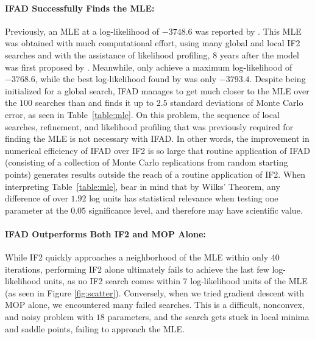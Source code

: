 \documentclass[9pt,twocolumn,pnasresearcharticle]{pnas-new}
\begin{document}
\paragraph{IFAD Successfully Finds the MLE:} Previously, an MLE at a log-likelihood of $-3748.6$ was reported by \cite{king16}.
This MLE was obtained with much computational effort, using many global and local IF2 searches and with the assistance of likelihood profiling, 8 years after the model was first proposed by \cite{king08}.
Meanwhile, \cite{ionides15} only achieve a maximum log-likelihood of $-3768.6$, while the best log-likelihood found by \cite{king08} was only $-3793.4$.
Despite being initialized for a global search, IFAD manages to get much closer to the MLE over the $100$ searches than \cite{ionides15} and finds it up to $2.5$ standard deviations of Monte Carlo error, as seen in Table~\ref{table:mle}.
On this problem, the sequence of local searches, refinement, and likelihood profiling that was previously required for finding the MLE is not necessary with IFAD. 
In other words, the improvement in numerical efficiency of IFAD over IF2 is so large that routine application of IFAD (consisting of a collection of Monte Carlo replications from random starting points) generates results outside the reach of a routine application of IF2. 
When interpreting Table~\ref{table:mle}, bear in mind that by Wilks' Theorem, any difference of over $1.92$ log units has statistical relevance when testing one parameter at the $0.05$ significance level, and therefore may have scientific value.

\paragraph{IFAD Outperforms Both IF2 and MOP Alone:} While IF2 quickly approaches a neighborhood of the MLE within only 40 iterations, performing IF2 alone ultimately fails to achieve the last few log-likelihood units, as no IF2 search comes within 7 log-likelihood units of the MLE (as seen in Figure \ref{fig:scatter}). Conversely, when we tried gradient descent with MOP alone, we encountered many failed searches. This is a difficult, nonconvex, and noisy problem with $18$ parameters, and the search gets stuck in local minima and saddle points, failing to approach the MLE. 
\end{document}
